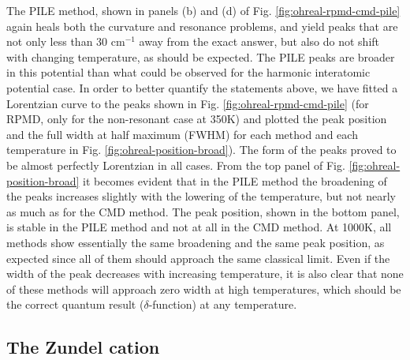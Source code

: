 \documentclass[aps,prb,superscriptaddress,amsmath,amssymb,showpacs,twocolumn]{revtex4}
\begin{document}
The PILE method, shown in panels (b) and (d) of Fig. \ref{fig:ohreal-rpmd-cmd-pile} again heals both the curvature 
and resonance problems, and yield peaks that are not only less than 30 cm$^{-1}$ away from the exact answer, but 
also do not shift with changing temperature, as should be expected. The PILE peaks are broader in this potential than
what could be observed for the harmonic interatomic potential case. In order to better quantify the statements above, 
we have fitted a Lorentzian curve to the peaks shown in Fig. \ref{fig:ohreal-rpmd-cmd-pile} (for RPMD, only for the 
non-resonant case at 350K) and plotted the peak position and the full width at half maximum (FWHM) for each 
method and each temperature in Fig. \ref{fig:ohreal-position-broad}). The form of the peaks proved to be almost 
perfectly Lorentzian in all cases. From the top panel of Fig. \ref{fig:ohreal-position-broad} it becomes evident that in the PILE method the broadening of the peaks increases slightly with the lowering of the temperature, but not nearly as much as for the CMD method. The peak position, shown in the bottom panel, is stable in the PILE method and not at all in the CMD method. At 1000K, all methods show essentially the same broadening and the same peak position, as expected since all of them should approach the same classical limit. Even if the width of the peak decreases with increasing temperature, it is also clear that none of these methods will approach zero width at high temperatures, which should be the correct quantum result ($\delta$-function) at any temperature.

\subsection{The Zundel cation}
\end{document}
